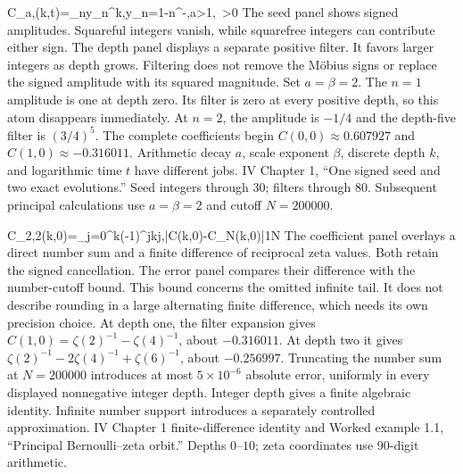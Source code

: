 {C_{a,\beta}(k,t)=\sum_{n}y_n^k,\qquad y_n=1-n^{-\beta},\quad a>1,\ \beta>0}
{The seed panel shows signed amplitudes. Squareful integers vanish, while squarefree integers can contribute either sign. The depth panel displays a separate positive filter. It favors larger integers as depth grows. Filtering does not remove the M\"obius signs or replace the signed amplitude with its squared magnitude.}
{Set $a=\beta=2$. The $n=1$ amplitude is one at depth zero. Its filter is zero at every positive depth, so this atom disappears immediately. At $n=2$, the amplitude is $-1/4$ and the depth-five filter is $(3/4)^5$. The complete coefficients begin $C(0,0)\approx0.607927$ and $C(1,0)\approx-0.316011$.}
{Arithmetic decay $a$, scale exponent $\beta$, discrete depth $k$, and logarithmic time $t$ have different jobs.}
{IV Chapter 1, ``One signed seed and two exact evolutions.'' Seed integers through 30; filters through 80. Subsequent principal calculations use $a=\beta=2$ and cutoff $N=200000$.}

{C_{2,2}(k,0)=\sum_{j=0}^k(-1)^j\binom kj,\qquad |C(k,0)-C_N(k,0)|\le\frac1N}
{The coefficient panel overlays a direct number sum and a finite difference of reciprocal zeta values. Both retain the signed cancellation. The error panel compares their difference with the number-cutoff bound. This bound concerns the omitted infinite tail. It does not describe rounding in a large alternating finite difference, which needs its own precision choice.}
{At depth one, the filter expansion gives $C(1,0)=\zeta(2)^{-1}-\zeta(4)^{-1}$, about $-0.316011$. At depth two it gives $\zeta(2)^{-1}-2\zeta(4)^{-1}+\zeta(6)^{-1}$, about $-0.256997$. Truncating the number sum at $N=200000$ introduces at most $5\times10^{-6}$ absolute error, uniformly in every displayed nonnegative integer depth.}
{Integer depth gives a finite algebraic identity. Infinite number support introduces a separately controlled approximation.}
{IV Chapter 1 finite-difference identity and Worked example 1.1, ``Principal Bernoulli--zeta orbit.'' Depths $0$--$10$; zeta coordinates use 90-digit arithmetic.}

